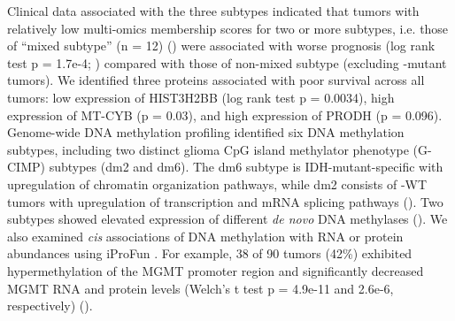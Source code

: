 \begin{figure}[t]
    \centering
\end{figure}

Clinical data associated with the three subtypes indicated that tumors with relatively low multi-omics membership scores for two or more subtypes, i.e. those of ``mixed subtype'' (n = 12) () were associated with worse prognosis (log rank test p = 1.7e-4; ) compared with those of non-mixed subtype (excluding -mutant tumors). We identified three proteins associated with poor survival across all tumors: low expression of HIST3H2BB (log rank test p = 0.0034), high expression of MT-CYB (p = 0.03), and high expression of PRODH (p = 0.096).
Genome-wide DNA methylation profiling identified six DNA methylation subtypes, including two distinct glioma CpG island methylator phenotype (G-CIMP) subtypes (dm2 and dm6). The dm6 subtype is IDH-mutant-specific with upregulation of chromatin organization pathways, while dm2 consists of -WT tumors with upregulation of transcription and mRNA splicing pathways ().
Two subtypes showed elevated expression of different \textit{de novo} DNA methylases (). We also examined \textit{cis} associations of DNA methylation with RNA or protein abundances using iProFun \cite{songx_wangp:InsightsImpact2019}.
For example, 38 of 90 tumors (42\%) exhibited hypermethylation of the MGMT promoter region and significantly decreased MGMT RNA and protein levels (Welch's t test p = 4.9e-11 and 2.6e-6, respectively) ().


